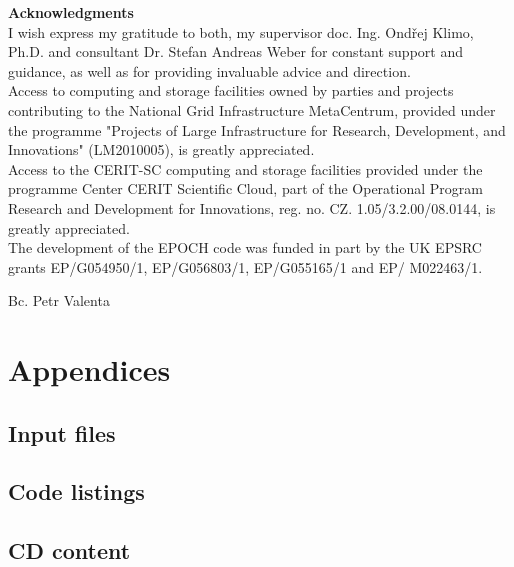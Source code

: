 \documentclass[12pt, twoside, a4paper, openright]{report}
\newcommand{\valenta}{Bc. Petr Valenta }
\newcommand{\klimo}{doc. Ing. Ondřej Klimo, Ph.D. }
\newcommand{\weber}{Dr. Stefan Andreas Weber }
\begin{document}
\newpage
\pagestyle{plain}
\null
\vfill
{\bf \noindent Acknowledgments} \\

I wish express my gratitude to both, my supervisor \klimo and consultant \weber for constant support and guidance, as well as for providing invaluable advice and direction.\\

Access to computing and storage facilities owned by parties and projects contributing to the National Grid Infrastructure MetaCentrum, provided under the programme "Projects of Large Infrastructure for Research, Development, and Innovations" (LM2010005), is greatly appreciated.\\

Access to the CERIT-SC computing and storage facilities provided under the programme Center CERIT Scientific Cloud, part of the Operational Program Research and Development for Innovations, reg. no. CZ. 1.05/3.2.00/08.0144, is greatly  appreciated.\\

The development of the EPOCH code was funded in part by the UK EPSRC grants EP/G054950/1, EP/G056803/1, EP/G055165/1 and EP/ M022463/1.\\
\begin{flushright}
\valenta
\end{flushright}


\newpage
{}




\part*{Appendices}

\appendix

\chapter{Input files}


\chapter{Code listings}


\chapter{CD content}

\end{document}
